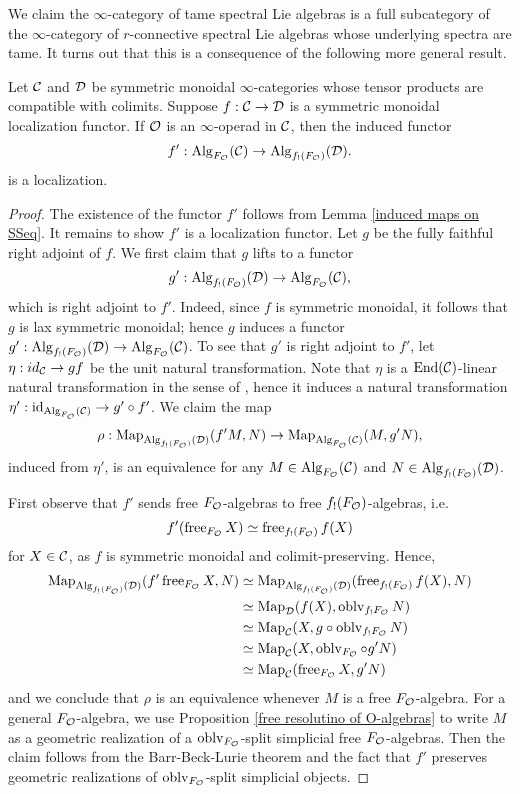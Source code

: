 We claim the $\infty$-category of tame spectral Lie algebras is a full subcategory of the $\infty$-category of $r$-connective spectral Lie algebras whose underlying spectra are tame. It turns out that this is a consequence of the following more general result.
\begin{proposition}
\label{Lifting localization to algebra category}
Let ${\mathcal{C}}$ and ${\mathcal{D}}$ be symmetric monoidal $\infty$-categories whose tensor products are compatible with colimits.
Suppose $f:{\mathcal{C}} \to {\mathcal{D}}$ is a symmetric monoidal localization functor.
If ${\mathcal{O}}$ is an $\infty$-operad in ${\mathcal{C}}$, then the induced functor
$$
f' : \operatorname{Alg}_{F_{\mathcal{O}}}({\mathcal{C}}) \to \operatorname{Alg}_{f_{!}(F_{\mathcal{O}})}({\mathcal{D}}).
$$
is a localization.
\end{proposition}
\begin{proof}
	The existence of the functor $f'$ follows from Lemma \ref{induced maps on SSeq}. It remains to show $f'$ is a localization functor. Let $g$ be the fully faithful right adjoint of $f$. We first claim that $g$ lifts to a functor 
	$$
	g': \operatorname{Alg}_{f_{!}(F_{\mathcal{O}})}({\mathcal{D}})
	\to 
	\operatorname{Alg}_{F_{\mathcal{O}}}({\mathcal{C}}),
	$$
	which is right adjoint to $f'$. 
	Indeed, since $f$ is symmetric monoidal, it follows that $g$ is lax symmetric monoidal; hence $g$ induces a functor $g': \operatorname{Alg}_{f_{!}(F_{\mathcal{O}})}({\mathcal{D}})
	\to 
	\operatorname{Alg}_{F_{\mathcal{O}}}({\mathcal{C}})$.
	To see that $g'$ is right adjoint to $f'$, let $\eta: id_{{\mathcal{C}}} \to gf$ be the unit natural transformation.
	Note that $\eta$ is a $\operatorname{End}({\mathcal{C}})$-linear natural transformation in the sense of \cite[Definition 4.6.2.7.]{HA}, hence it induces a natural transformation $\eta': \operatorname{id}_{\operatorname{Alg}_{F_{{\mathcal{O}}}}({\mathcal{C}})} \to g'\circ f'$.
	We claim the map
	$$
	\rho:
	\operatorname{Map}_{\operatorname{Alg}_{f_{!}(F_{\mathcal{O}})}({\mathcal{D}})}(f'M, N)
	\to 
	\operatorname{Map}_{\operatorname{Alg}_{F_{\mathcal{O}}}({\mathcal{C}})}(M, g'N),
	$$
	induced from $\eta'$,
	is an equivalence for any $M\in \operatorname{Alg}_{F_{\mathcal{O}}}({\mathcal{C}})$ and $N\in \operatorname{Alg}_{f_{!}(F_{\mathcal{O}})}({\mathcal{D}})$. 
	
	First observe that $f'$ sends free $F_{\mathcal{O}}$-algebras to free $f_{!}(F_{\mathcal{O}})$-algebras, i.e.
	$$
	f'(\operatorname{free}_{F_{{\mathcal{O}}}} X)\simeq \operatorname{free}_{f_{!}(F_{\mathcal{O}})} f(X)
	$$
	for $X\in {\mathcal{C}}$,
	as $f$ is symmetric monoidal and colimit-preserving. 
	Hence, 
    \begin{align*}
        \operatorname{Map}_{\operatorname{Alg}_{f_{!}(F_{\mathcal{O}})}({\mathcal{D}})}(f'\operatorname{free}_{F_{{\mathcal{O}}}} X, N) & \simeq \operatorname{Map}_{\operatorname{Alg}_{f_{!}(F_{\mathcal{O}})}({\mathcal{D}})}(\operatorname{free}_{f_{!}(F_{\mathcal{O}})} f(X), N)\\
        & \simeq \operatorname{Map}_{{\mathcal{D}}}(f(X), \operatorname{oblv}_{f_{!}F_{{\mathcal{O}}}}N)\\
        & \simeq \operatorname{Map}_{{\mathcal{C}}}(X, g \circ \operatorname{oblv}_{f_{!}F_{{\mathcal{O}}}}N)\\
        & \simeq \operatorname{Map}_{{\mathcal{C}}}(X, \operatorname{oblv}_{F_{{\mathcal{O}}}}\circ g' N)\\
        & \simeq \operatorname{Map}_{{\mathcal{C}}}(\operatorname{free}_{F_{{\mathcal{O}}}}  X, g' N)
    \end{align*}	
    and we conclude that
	$\rho$ is an equivalence whenever $M$ is a free $F_{{\mathcal{O}}}$-algebra. For a general $F_{{\mathcal{O}}}$-algebra, we use Proposition \ref{free resolutino of O-algebras} to write $M$ as a geometric realization of a $\operatorname{oblv}_{F_{{\mathcal{O}}}}$-split simplicial free $F_{{\mathcal{O}}}$-algebras. Then the claim follows from the Barr-Beck-Lurie theorem \cite[Theorem 4.7.3.5.]{HA} and the fact that $f'$ preserves geometric realizations of $\operatorname{oblv}_{F_{{\mathcal{O}}}}$-split simplicial objects.
	

\end{proof}
